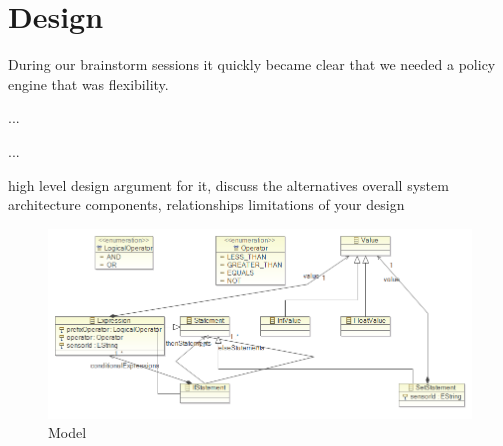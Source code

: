 \section{Design}
During our brainstorm sessions it quickly became clear that we needed a policy engine that was flexibility.

...


...


high level design
argument for it, discuss the alternatives
overall system architecture
components, relationships
limitations of your design

\begin{figure}[t]
\includegraphics[width=1.00\columnwidth]{model.png}
\caption{Model}
\end{figure}